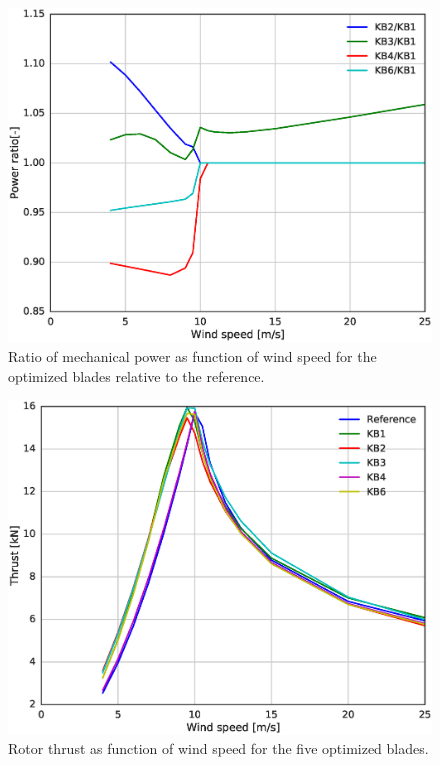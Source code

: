 \begin{figure}[!ht]
\begin{center}
	\includegraphics[width=.85\linewidth]{figures/KBcomp_power_ratio.eps}
\end{center}
\caption{Ratio of mechanical power as function of wind speed for the optimized blades relative to the reference.}
\label{fig:powerratio}
\end{figure}

\begin{figure}[!ht]
\begin{center}
	\includegraphics[width=.85\linewidth]{figures/KBcomp_thrust.eps}
\end{center}
\caption{Rotor thrust as function of wind speed for the five optimized blades.}
\label{fig:thrust}
\end{figure}

